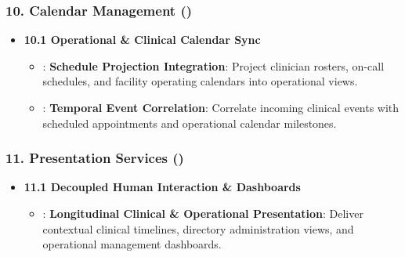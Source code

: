 \subsubsection*{10. Calendar Management (\texttt{})}
\label{rad:enabling:659}

\begin{itemize}

\item 
\textbf{10.1 Operational \& Clinical Calendar Sync}


\begin{itemize}

\item 
\texttt{}: \textbf{Schedule Projection Integration}: Project clinician rosters, on-call schedules, and facility operating calendars into operational views.



\item 
\texttt{}: \textbf{Temporal Event Correlation}: Correlate incoming clinical events with scheduled appointments and operational calendar milestones.



\end{itemize}


\end{itemize}
\label{rad:enabling:663}
\subsubsection*{11. Presentation Services (\texttt{})}
\label{rad:enabling:664}

\begin{itemize}

\item 
\textbf{11.1 Decoupled Human Interaction \& Dashboards}


\begin{itemize}

\item 
\texttt{}: \textbf{Longitudinal Clinical \& Operational Presentation}: Deliver contextual clinical timelines, directory administration views, and operational management dashboards.



\end{itemize}


\end{itemize}
\label{rad:enabling:667}
